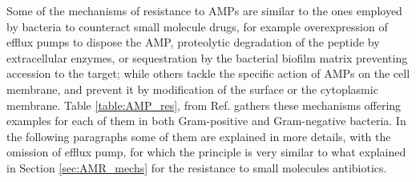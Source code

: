 Some of the mechanisms of resistance to AMPs are similar to the ones employed by bacteria to counteract small molecule drugs, for example overexpression of efflux pumps to dispose the AMP, proteolytic degradation of the peptide by extracellular enzymes, or sequestration by the bacterial biofilm matrix preventing accession to the target; while others tackle the specific action of AMPs on the cell membrane, and prevent it by modification of the surface or the cytoplasmic membrane. Table \ref{table:AMP_res}, from Ref. \cite{Joo2016} gathers these mechanisms offering examples for each of them in both Gram-positive and Gram-negative bacteria.
%
In the following paragraphs some of them are explained in more details, with the omission of efflux pump, for which the principle is very similar to what explained in Section \ref{sec:AMR_mechs} for the resistance to small molecules antibiotics.

